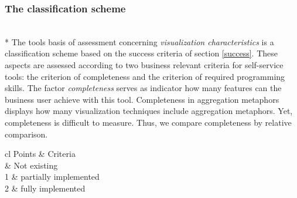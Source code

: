 \subsubsection{The classification scheme}\label{tool:classification}\\*
The tools basis of assessment concerning \textit{visualization characteristics} is a classification scheme based on the success criteria of section \ref{success}. These aspects are assessed according to two business relevant criteria for self-service tools: the criterion of completeness and the criterion of required programming skills. The factor \textit{completeness} serves as indicator how many features can the business user achieve with this tool. Completeness in aggregation metaphors displays how many visualization techniques include aggregation metaphors. Yet, completeness is difficult to measure. Thus, we compare completeness by relative comparison.
\begin{table}[H]
	\caption[Tool Completeness]{Criteria Completeness: extend to which assessed aspect is implemented in tool}
	\label{programming-skills}
	\begin{tabu}{cl}
	\hline
	Points & Criteria\\
	 & Not existing\\
	1 & partially implemented \\
	2 & fully implemented \\
	\hline
	\end{tabu}
\end{table}

